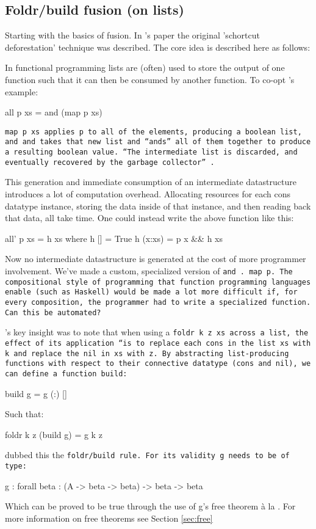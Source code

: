 \subsection{Foldr/build fusion (on lists)}\label{sec:foldr/build}
Starting with the basics of fusion. In \cite{Gill1993}'s paper the original 'schortcut deforestation' technique was described. The core idea is described here as follows:

In functional programming lists are (often) used to store the output of one function such that it can then be consumed by another function. To co-opt \cite{Gill1993}'s example:
\begin{code}
    all p xs = and (map p xs)
\end{code}

\tt{map p xs} applies \tt{p} to all of the elements, producing a boolean list, and \tt{and} takes that new list and ``ands'' all of them together to produce a resulting boolean value. ``The intermediate list is discarded, and eventually recovered by the garbage collector'' \citep{Gill1993}.

This generation and immediate consumption of an intermediate datastructure introduces a lot of computation overhead. Allocating resources for each cons datatype instance, storing the data inside of that instance, and then reading back that data, all take time. One could instead write the above function like this:
\begin{code}
    all' p xs = h xs
       where h []     = True
             h (x:xs) = p x && h xs
\end{code}
Now no intermediate datastructure is generated at the cost of more programmer involvement. We've made a custom, specialized version of \tt{and~.~map~p}. The compositional style of programming that function programming languages enable (such as Haskell) would be made a lot more difficult if, for every composition, the programmer had to write a specialized function. Can this be automated?

\cite{Gill1993}'s key insight was to note that when using a \tt{foldr k z xs} across a list, the effect of its application ``is to replace each \tt{cons} in the list \tt{xs} with k and replace the \tt{nil} in \tt{xs} with \tt{z}. By abstracting list-producing functions with respect to their connective datatype (\tt{cons} and \tt{nil}), we can define a function \tt{build}:
\begin{code}
    build g = g (:) []
\end{code}
Such that:
\begin{code}
    foldr k z (build g) = g k z
\end{code}
\cite{Gill1993} dubbed this the \tt{foldr/build} rule. For its validity \tt{g} needs to be of type:
\begin{code}
    g : forall beta : (A -> beta -> beta) -> beta -> beta
\end{code}
Which can be proved to be true through the use of g's free theorem \`a la \cite{Wadler1989}. For more information on free theorems see Section \ref{sec:free}

